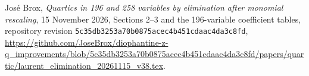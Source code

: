  Jos\'e Brox,
\emph{Quartics in 196 and 258 variables by elimination after monomial rescaling},
15 November 2026, Sections 2--3 and the 196-variable coefficient tables,
repository revision \texttt{5c35db3253a70b0875acec4b451cdaac4da3c8fd},
\url{https://github.com/JoseBrox/diophantine-z-q_improvements/blob/5c35db3253a70b0875acec4b451cdaac4da3c8fd/papers/quartic/laurent_elimination_20261115_v38.tex}.
